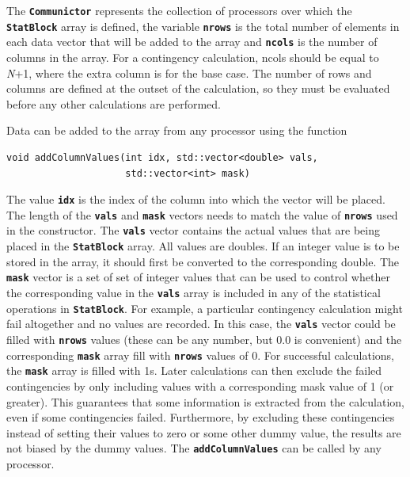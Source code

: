 \documentclass[12pt]{report} %
\begin{document}
The \texttt{\textbf{Communictor}} represents the collection of processors over which the \texttt{\textbf{StatBlock}} array is defined, the variable \texttt{\textbf{nrows}} is the total number of elements in each data vector that will be added to the array and \texttt{\textbf{ncols}} is the number of columns in the array. For a contingency calculation, ncols should be equal to \textit{N}+1, where the extra column is for the base case. The number of rows and columns are defined at the outset of the calculation, so they must be evaluated before any other calculations are performed.

Data can be added to the array from any processor using the function

{
\color{red}
\begin{Verbatim}[fontseries=b]
void addColumnValues(int idx, std::vector<double> vals,
                     std::vector<int> mask)
\end{Verbatim}
}

The value \texttt{\textbf{idx}} is the index of the column into which the vector will be placed. The length of the \texttt{\textbf{vals}} and \texttt{\textbf{mask}} vectors needs to match the value of \texttt{\textbf{nrows}} used in the constructor. The \texttt{\textbf{vals}} vector contains the actual values that are being placed in the \texttt{\textbf{StatBlock}} array. All values are doubles. If an integer value is to be stored in the array, it should first be converted to the corresponding double. The \texttt{\textbf{mask}} vector is a set of set of integer values that can be used to control whether the corresponding value in the \texttt{\textbf{vals}} array is included in any of the statistical operations in \texttt{\textbf{StatBlock}}. For example, a particular contingency calculation might fail altogether and no values are recorded. In this case, the \texttt{\textbf{vals}} vector could be filled with \texttt{\textbf{nrows}} values (these can be any number, but 0.0 is convenient) and the corresponding \texttt{\textbf{mask}} array fill with \texttt{\textbf{nrows}} values of 0. For successful calculations, the \texttt{\textbf{mask}} array is filled with 1s. Later calculations can then exclude the failed contingencies by only including values with a corresponding mask value of 1 (or greater). This guarantees that some information is extracted from the calculation, even if some contingencies failed. Furthermore, by excluding these contingencies instead of setting their values to zero or some other dummy value, the results are not biased by the dummy values. The \texttt{\textbf{addColumnValues}} can be called by any processor.
\end{document}
